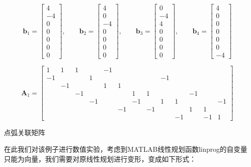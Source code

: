 \documentclass[UTF8]{ctexart}
\begin{document}
\[\bm{b}_1=\begin{bmatrix}
4\\-4\\0\\0\\0\\0\\0
\end{bmatrix},\qquad
\bm{b}_2=\begin{bmatrix}
4\\0\\-4\\0\\0\\0\\0
\end{bmatrix},\qquad
\bm{b}_3=\begin{bmatrix}
0\\-4\\4\\0\\0\\0\\0
\end{bmatrix},\qquad
\bm{b}_4=\begin{bmatrix}
4\\0\\0\\0\\0\\0\\-4
\end{bmatrix}
\]
\begin{table}[htbp]
\centering
\label{e1}

\[\bm{A}_1 = \left[ {\begin{array}{*{20}{c}}
1&1&1&{}&-1&{}&{}&{}&{}&{}&{}&{}&{}\\
-1&{}&{}&1&{}&{}&{}&{}&-1&{}&{}&{}&{}\\
{}&-1&{}&{}&1&1&{}&{}&{}&{}&{}&{}&{}\\
{}&{}&-1&{}&{}&{}&1&1&{}&{}&-1&{}&{}\\
{}&{}&{}&-1&{}&{}&-1&{}&1&1&{}&{}&-1\\
{}&{}&{}&{}&{}&-1&{}&-1&{}&{}&1&1&{}\\
{}&{}&{}&{}&{}&{}&{}&{}&{}&-1&{}&-1&1
\end{array}} \right]\]
\caption{点弧关联矩阵}
\end{table}

\newpage
在此我们对该例子进行数值实验，考虑到MATLAB线性规划函数linprog的自变量只能为向量，我们需要对原线性规划进行变形，变成如下形式：
\end{document}
